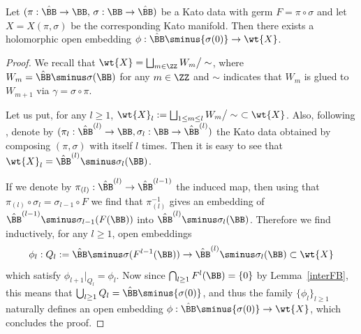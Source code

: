 \begin{proposition}\label{embBall}
Let $(\pi:\hat\BB\to\BB,\,\sigma:\BB\to\hat\BB)$ be a Kato data with germ $F=\pi\circ\sigma$ and let $X=X(\pi,\sigma)$ be the corresponding Kato manifold. Then there exists a holomorphic open embedding $\phi:\hat\BB\sminus \{\sigma(0)\}\to \wt{X}$.
\end{proposition}

\Changel
\begin{proof}
We recall that $\wt{X}=\bigsqcup_{m\in\ZZ} W_m \big/\sim$, where $W_m=\hat\BB\sminus \sigma(\BB)$ for any $m\in\ZZ$ and $\sim$ indicates that $W_m$ is glued to $W_{m+1}$ via $\gamma=\sigma\circ\pi$.

Let us put, for any $l\geq 1$, $\wt{X}_l:=\bigsqcup_{1\leq m\leq l} W_m \big/\sim \, \,\subset \wt{X}$. Also, following \cite[\S 1]{iop}, denote by $(\pi_l:\hat\BB^{(l)}\to\BB,\sigma_l:\BB\to\hat\BB^{(l)})$ the Kato data obtained by composing $(\pi,\sigma)$ with itself $l$ times. Then it is easy to see that $\wt{X}_l=\hat\BB^{(l)}\sminus \sigma_l(\BB)$.

If we denote by $\pi_{(l)}:\hat\BB^{(l)}\to\hat\BB^{(l-1)}$ the induced map, then using that $\pi_{(l)}\circ\sigma_l=\sigma_{l-1}\circ F$ we find that $\pi^{-1}_{(l)}$ gives an embedding of $\hat\BB^{(l-1)}\sminus \sigma_{l-1}(F(\BB))$ into $\hat\BB^{(l)}\sminus \sigma_l(\BB)$. Therefore we find inductively, for any $l\geq 1$, open embeddings
\begin{equation*}
\phi_l:Q_l:=\hat\BB\sminus \sigma(F^{l-1}(\BB))\to\hat\BB^{(l)}\sminus \sigma_l(\BB)\subset \wt{X}
\end{equation*}
which satisfy $\phi_{l+1}|_{Q_l}=\phi_l$. Now since $\bigcap_{l\geq 1} F^l(\BB)=\{0\}$ by Lemma~\ref{interFB}, this means that $\bigcup_{l\geq 1} Q_l=\hat\BB\sminus \{\sigma(0)\}$, and thus the family $\{\phi_l\}_{l\geq 1}$ naturally defines an open embedding $\phi:\hat\BB\sminus \{\sigma(0)\}\to \wt{X}$, which concludes the proof.
\end{proof}

